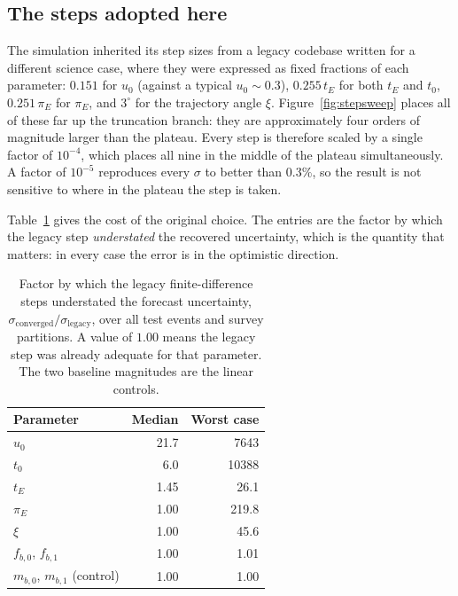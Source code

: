 \subsection{The steps adopted here}
\label{app:stepsize_adopted}

The simulation inherited its step sizes from a legacy codebase written for a different
science case, where they were expressed as fixed fractions of each parameter: $0.151$ for $u_0$
(against a typical $u_0 \sim 0.3$), $0.255\,t_E$ for both $t_E$ and $t_0$, $0.251\,\pi_E$ for
$\pi_E$, and $3^\circ$ for the trajectory angle $\xi$. Figure~\ref{fig:stepsweep} places all of
these far up the truncation branch: they are approximately four orders of magnitude larger than
the plateau. Every step is therefore scaled by a single factor of $10^{-4}$, which places all nine
in the middle of the plateau simultaneously. A factor of $10^{-5}$ reproduces every $\sigma$ to
better than $0.3\%$, so the result is not sensitive to where in the plateau the step is taken.

Table~\ref{tab:stepbias} gives the cost of the original choice. The entries are the factor by
which the legacy step \emph{understated} the recovered uncertainty, which is the quantity that
matters: in every case the error is in the optimistic direction.

\begin{table}[htbp]
	\centering
	\caption{Factor by which the legacy finite-difference steps understated the forecast
	uncertainty, $\sigma_{\mathrm{converged}} / \sigma_{\mathrm{legacy}}$, over all test events and
	survey partitions. A value of $1.00$ means the legacy step was already adequate for that
	parameter. The two baseline magnitudes are the linear controls.}
	\label{tab:stepbias}
	\begin{tabular}{lrr}
		\toprule
		Parameter & Median & Worst case \\
		\midrule
		$u_0$        & 21.7 & 7643 \\
		$t_0$        &  6.0 & 10388 \\
		$t_E$        &  1.45 &  26.1 \\
		$\pi_E$      &  1.00 & 219.8 \\
		$\xi$        &  1.00 &  45.6 \\
		$f_{b,0}$, $f_{b,1}$ & 1.00 & 1.01 \\
		$m_{b,0}$, $m_{b,1}$ (control) & 1.00 & 1.00 \\
		\bottomrule
	\end{tabular}
\end{table}

